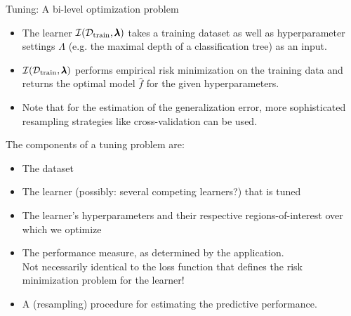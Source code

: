 \begin{frame}{Tuning: A bi-level optimization problem}
\begin{itemize}
\item The learner $\mathcal{I}(\mathcal{D}_{\text{train}}, \pmb{\lambda})$ takes a training dataset as well as hyperparameter settings $\Lambda$ (e.g. the maximal depth of a classification tree) as an input.
\item $\mathcal{I}(\mathcal{D}_{\text{train}}, \pmb{\lambda})$ performs empirical risk minimization on the training data and returns the optimal model $\hat f$ for the given hyperparameters.
\item Note that for the estimation of the generalization error, more sophisticated resampling strategies like cross-validation can be used.
\end{itemize}

\framebreak

The components of a tuning problem are:

\begin{itemize}
\item The dataset
\item The learner (possibly: several competing learners?) that is tuned %
\item The learner's hyperparameters and their respective regions-of-interest over which we optimize %
\item The performance measure, as determined by the application.\\ Not necessarily identical to the loss function that defines the risk minimization problem for the learner!\\
\item A (resampling) procedure for estimating the predictive performance.
\end{itemize}



\end{frame}




